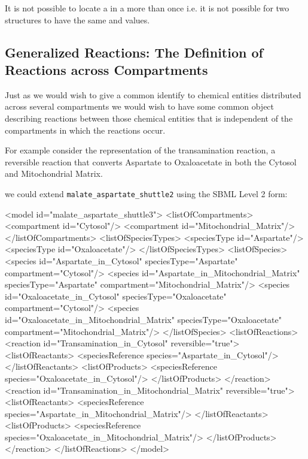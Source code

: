 \documentclass{cekarticle}
\begin{document}
It is not possible to locate a  in a  more than once
i.e. it is not possible for two  structures to have the same
 and  values.

\subsection{Generalized Reactions: The Definition of Reactions across Compartments}
\label{sec:commonreaction}

Just as we would wish to give a common identify to chemical entities distributed across several
compartments we would wish to have some common object describing reactions between those chemical
entities that is independent of the compartments in which the reactions occur.

For example consider the representation of the transamination reaction, a reversible reaction
that converts Aspartate to Oxaloacetate in both the Cytosol and Mitochondrial Matrix.

we could extend \texttt{malate\_aspartate\_shuttle2} using the SBML Level 2 form:
\begin{example}
<model id="malate_aspartate_shuttle3">
    <listOfCompartments>
        <compartment id="Cytosol"/>
        <compartment id="Mitochondrial_Matrix"/>
    </listOfCompartments>
    <listOfSpeciesTypes>
        <speciesType id="Aspartate"/>
        <speciesType id="Oxaloacetate"/>
    </listOfSpeciesTypes>
    <listOfSpecies>
        <species
            id="Aspartate_in_Cytosol"
            speciesType="Aspartate"
            compartment="Cytosol"/>
        <species
            id="Aspartate_in_Mitochondrial_Matrix"
            speciesType="Aspartate"
            compartment="Mitochondrial_Matrix"/>
        <species
            id="Oxaloacetate_in_Cytosol"
            speciesType="Oxaloacetate"
            compartment="Cytosol"/>
        <species
            id="Oxaloacetate_in_Mitochondrial_Matrix"
            speciesType="Oxaloacetate"
            compartment="Mitochondrial_Matrix"/>
    </listOfSpecies>
    <listOfReactions>
        <reaction id="Transamination_in_Cytosol" reversible="true">
            <listOfReactants>
                <speciesReference species="Aspartate_in_Cytosol"/>
            </listOfReactants>
            <listOfProducts>
                <speciesReference species="Oxaloacetate_in_Cytosol"/>
            </listOfProducts>
        </reaction>
        <reaction id="Transamination_in_Mitochondrial_Matrix" reversible="true">
            <listOfReactants>
                <speciesReference species="Aspartate_in_Mitochondrial_Matrix"/>
            </listOfReactants>
            <listOfProducts>
                <speciesReference species="Oxaloacetate_in_Mitochondrial_Matrix"/>
            </listOfProducts>
        </reaction>
    </listOfReactions>
</model>
\end{example}
\end{document}
